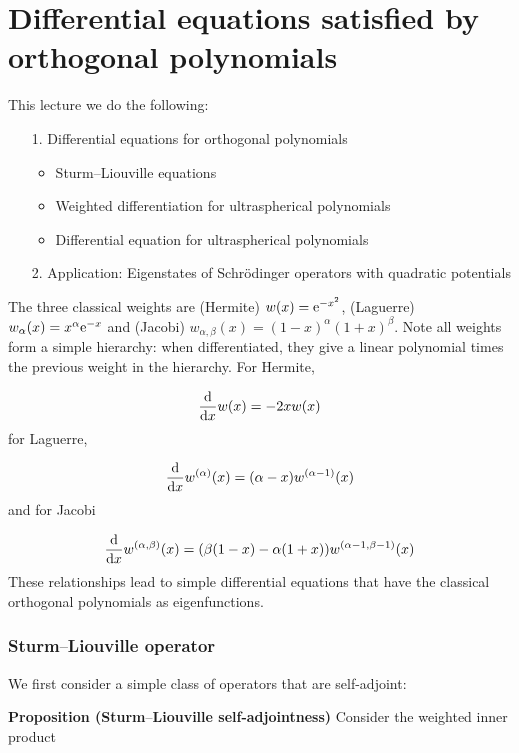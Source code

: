 \documentclass[12pt,a4paper]{article}
\def\endash{–}
\begin{document}
\section{Differential equations satisfied by orthogonal polynomials}
This lecture we do the following:

\begin{itemize}
\item[1. ] Differential equations for orthogonal polynomials

\begin{itemize}
\item Sturm\ensuremath{\endash}Liouville equations


\item Weighted differentiation for ultraspherical polynomials


\item Differential equation for ultraspherical polynomials

\end{itemize}

\item[2. ] Application: Eigenstates of Schrödinger operators with quadratic potentials

\end{itemize}
The three classical weights are (Hermite) $w(x) = {\rm e}^{-x^2}$, (Laguerre) $w_\alpha(x) = x^\alpha {\rm e}^{-x}$ and (Jacobi) $w_{\alpha,\beta}(x) = (1-x)^\alpha (1+x)^\beta$. Note all weights form a simple hierarchy: when differentiated, they give a linear polynomial times the previous weight in the hierarchy.  For Hermite,

\[
{{\rm d} \over {\rm d}x} w(x) = -2x w(x)
\]
for Laguerre,

\[
{{\rm d} \over {\rm d}x} w^{(\alpha)}(x) = (\alpha  - x) w^{(\alpha-1)}(x)
\]
and for Jacobi

\[
{{\rm d} \over {\rm d}x} w^{(\alpha,\beta)}(x) = (\beta(1-x) - \alpha(1+x)) w^{(\alpha-1,\beta-1)}(x)
\]
These relationships  lead to simple differential equations that have the classical orthogonal polynomials as eigenfunctions.

\subsubsection{Sturm\ensuremath{\endash}Liouville operator}
We first consider a simple class of operators that are self-adjoint:

\textbf{Proposition (Sturm\ensuremath{\endash}Liouville self-adjointness)} Consider the weighted inner product
\end{document}
